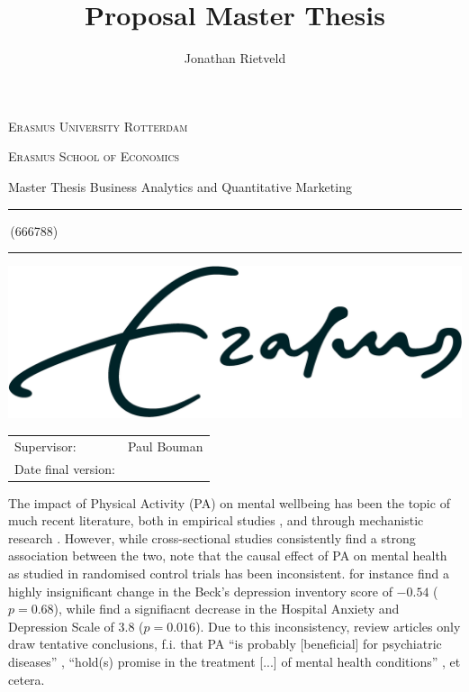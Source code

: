 \documentclass[a4paper,11pt]{report}
\author{Jonathan Rietveld}
\title{Proposal Master Thesis}
\newcommand{\studentnumber}{666788}
\newcommand{\program}{Business Analytics and Quantitative Marketing}
\newcommand{\supervisor}{Paul Bouman}
\begin{document}
\begin{titlepage}
\makeatletter
\begin{center}
	\textsc{Erasmus University Rotterdam}
	\par \textsc{Erasmus School of Economics}
	\par Master Thesis \program

	\vfill \hrule height .08em \bigskip
	\par\huge\@title\bigskip
	\par\Large\@author\,(\studentnumber)\bigskip
	\hrule height .08em\normalsize

	\vfill
	\includegraphics[width=\textwidth,height=0.15\textheight,keepaspectratio]{../common/eur}
	\vfill

	\begin{tabular}{ll}
		\toprule
		Supervisor: & \supervisor\\
		Date final version: & \@date\\
		\bottomrule
	\end{tabular}

	\vfill
\end{center}
\makeatother
\end{titlepage}

The impact of Physical Activity (PA) on mental wellbeing has been the topic of much recent literature,
both in empirical studies \cite{noetel2024effect, mahindru2023role}, and through mechanistic research \cite{smith2021role}.
However, while cross-sectional studies consistently find a strong association between the two, 
note that the causal effect of PA on mental health as studied in randomised control trials has been inconsistent.
 for instance find a highly insignificant change in the Beck's depression inventory score
of $-0.54$ ($p = 0.68$), while  find a signifiacnt decrease in the Hospital Anxiety and
Depression Scale of $3.8$ ($p = 0.016$).
Due to this inconsistency, review articles only draw tentative conclusions, f.i. that PA ``is probably [beneficial]
for psychiatric diseases'' \cite{peluso2005physical}, ``hold(s) promise in the treatment [...] of mental health conditions''
\cite{smith2021role}, et cetera.
\end{document}
